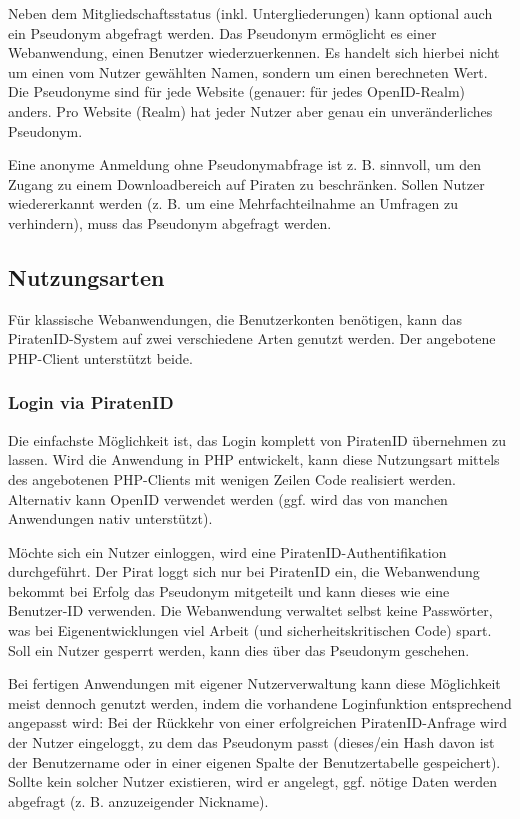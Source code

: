Neben dem Mitgliedschaftsstatus (inkl. Untergliederungen) kann optional auch ein Pseudonym abgefragt werden.
Das Pseudonym ermöglicht es einer Webanwendung, einen Benutzer wiederzuerkennen.
Es handelt sich hierbei nicht um einen vom Nutzer gewählten Namen, sondern um einen berechneten Wert.
Die Pseudonyme sind für jede Website (genauer: für jedes OpenID-Realm) anders.
Pro Website (Realm) hat jeder Nutzer aber genau ein unveränderliches Pseudonym.

Eine anonyme Anmeldung ohne Pseudonymabfrage ist z. B. sinnvoll, um den Zugang zu einem Downloadbereich auf Piraten zu beschränken.
Sollen Nutzer wiedererkannt werden (z. B. um eine Mehrfachteilnahme an Umfragen zu verhindern), muss das Pseudonym abgefragt werden.

\subsection{Nutzungsarten}
Für klassische Webanwendungen, die Benutzerkonten benötigen, kann das PiratenID-System auf zwei verschiedene Arten genutzt werden.
Der angebotene PHP-Client unterstützt beide.

\subsubsection{Login via PiratenID}
Die einfachste Möglichkeit ist, das Login komplett von PiratenID übernehmen zu lassen.
Wird die Anwendung in PHP entwickelt, kann diese Nutzungsart mittels des angebotenen PHP-Clients mit wenigen Zeilen Code realisiert werden.
Alternativ kann OpenID verwendet werden (ggf. wird das von manchen Anwendungen nativ unterstützt).

Möchte sich ein Nutzer einloggen, wird eine PiratenID-Authentifikation durchgeführt.
Der Pirat loggt sich nur bei PiratenID ein, die Webanwendung bekommt bei Erfolg das Pseudonym mitgeteilt und kann dieses wie eine Benutzer-ID verwenden.
Die Webanwendung verwaltet selbst keine Passwörter, was bei Eigenentwicklungen viel Arbeit (und sicherheitskritischen Code) spart.
Soll ein Nutzer gesperrt werden, kann dies über das Pseudonym geschehen.

Bei fertigen Anwendungen mit eigener Nutzerverwaltung kann diese Möglichkeit meist dennoch genutzt werden, indem die vorhandene Loginfunktion entsprechend angepasst wird:
Bei der Rückkehr von einer erfolgreichen PiratenID-Anfrage wird der Nutzer eingeloggt, zu dem das Pseudonym passt
(dieses/ein Hash davon ist der Benutzername oder in einer eigenen Spalte der Benutzertabelle gespeichert).
Sollte kein solcher Nutzer existieren, wird er angelegt, ggf. nötige Daten werden abgefragt (z. B. anzuzeigender Nickname).


